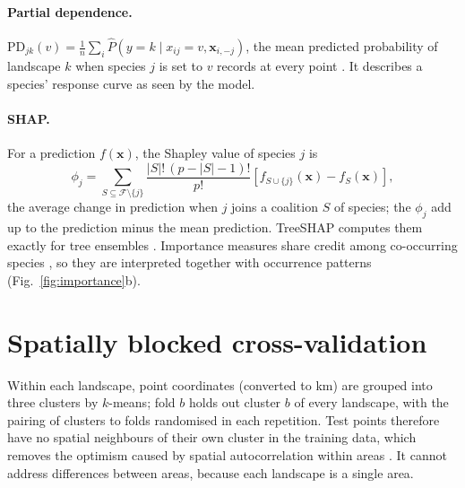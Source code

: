 \documentclass[10pt,a4paper,twocolumn]{article}
\begin{document}
\paragraph{Partial dependence.} $\mathrm{PD}_{jk}(v)=\frac1n\sum_i\hat P(y=k\mid x_{ij}=v,\mathbf{x}_{i,-j})$,
the mean predicted probability of landscape $k$ when species $j$ is set to $v$ records at every point
\citep{friedman2001}. It describes a species' response curve as seen by the model.

\paragraph{SHAP.} For a prediction $f(\mathbf{x})$, the Shapley value of species $j$ is
\[
\phi_j=\sum_{S\subseteq\mathcal{F}\setminus\{j\}}\frac{|S|!\,(p-|S|-1)!}{p!}
\left[f_{S\cup\{j\}}(\mathbf{x})-f_S(\mathbf{x})\right],
\]
the average change in prediction when $j$ joins a coalition $S$ of species; the $\phi_j$ add up to
the prediction minus the mean prediction. TreeSHAP computes them exactly for tree ensembles
\citep{lundberg2017,lundberg2020}. Importance measures share credit among co-occurring species
\citep{strobl2007}, so they are interpreted together with occurrence patterns (Fig.~\ref{fig:importance}b).

\section{Spatially blocked cross-validation}\label{app:spatial}
Within each landscape, point coordinates (converted to km) are grouped into three clusters by
$k$-means; fold $b$ holds out cluster $b$ of every landscape, with the pairing of clusters to folds
randomised in each repetition. Test points therefore have no spatial neighbours of their own cluster in
the training data, which removes the optimism caused by spatial autocorrelation within areas
\citep{roberts2017,ploton2020}. It cannot address differences between areas, because each landscape
is a single area.
\end{document}

